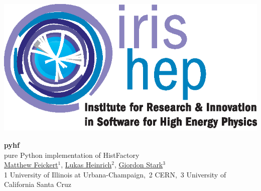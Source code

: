 \documentclass[princeton,portrait]{a0poster}
\begin{document}
%
%
%
\begin{minipage}[b]{\linewidth}
 \hspace{-5cm}
 \begin{minipage}{0.2\linewidth}
  \href{https://iris-hep.org/}{\includegraphics[width=\linewidth]{IRIS-HEP_logo.eps}}
 \end{minipage}%
 \quad
 \begin{minipage}{0.58\linewidth}
  \VERYHuge \color{Black} \textbf{pyhf}\\[0.5cm] \color{Black}\Huge{pure Python implementation of HistFactory}\\[1cm] %
  \color{DarkSlateGray} %
  \LARGE {\href{https://www.matthewfeickert.com/}{\underline{Matthew Feickert}$^{1}$}}, \href{http://www.lukasheinrich.com/}{Lukas Heinrich$^{2}$}, \href{https://giordonstark.com/}{Giordon Stark$^{3}$}\\[0.5cm] %
  \normalsize {1 University of Illinois at Urbana-Champaign,~2 CERN,~3 University of California Santa Cruz}\\[1cm]%
  \color{Black}
 \end{minipage}
 \quad
 \begin{minipage}{0.22\linewidth}

\end{minipage}
\end{minipage}
\end{document}
